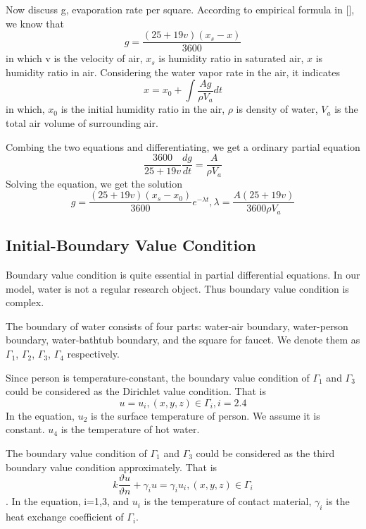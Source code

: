 \documentclass[12pt,a4paper,titlepage]{article}
\begin{document}
Now discuss g, evaporation rate per square. According to empirical formula in [], we know that
\begin{equation}
 g=\frac{(25+19v)({x_s}-x)}{3600}
\end{equation}
in which v is the velocity of air, ${x_s}$ is humidity ratio in saturated air, $x$ is humidity ratio in air.
Considering the water vapor rate in the air, it indicates
\begin{equation}
 x=x_0+\int \frac{Ag}{\rho V_a}dt
\end{equation}
in which, $x_0$ is the initial humidity ratio in the air, $\rho$ is density of water, $V_a$ is the total air volume of surrounding air.

Combing the two equations and differentiating, we get a ordinary partial equation
\begin{equation}
 \frac{3600}{25+19v} \frac{dg}{dt}=\frac{A}{\rho {V_a}}
\end{equation}
Solving the equation, we get the solution
\begin{equation}
 g=\frac{(25+19v)({x_s}-{x_0})}{3600}e^{-\lambda t}, \lambda =\frac{A(25+19v)}{3600\rho {V_a}}
\end{equation}


\subsection{Initial-Boundary Value Condition}
\label{initial-boundary value condition}

Boundary value condition is quite essential in partial differential equations. In our model, water is not a regular research object.
Thus boundary value condition is complex.

The boundary of water consists of four parts: water-air boundary, water-person boundary, water-bathtub boundary, and the square for faucet. We denote them as
${\Gamma}_1$, ${\Gamma}_2$, ${\Gamma}_3$, ${\Gamma}_4$ respectively.

Since person is temperature-constant, the boundary value condition of ${\Gamma}_1$ and ${\Gamma}_3$ could be considered
as the Dirichlet value condition. That is
\begin{equation}
 u=u_i, (x,y,z)\in {\Gamma}_i, i=2.4
\end{equation}
In the equation, $u_2$ is the surface temperature of person. We assume it is constant. $u_4$ is the temperature of hot water.

The boundary value condition of ${\Gamma}_1$ and ${\Gamma}_3$ could be considered as the third boundary value condition approximately. That is
\begin{equation}
 k\frac{\vartheta u}{\vartheta n}+{{\gamma}_i}u={{\gamma}_i}{u_i}, (x,y,z)\in {\Gamma}_i
\end{equation}.
In the equation, i=1,3, and $u_i$ is the temperature of contact material,
${\gamma}_i$ is the heat exchange coefficient of ${\Gamma}_i$.
\end{document}
